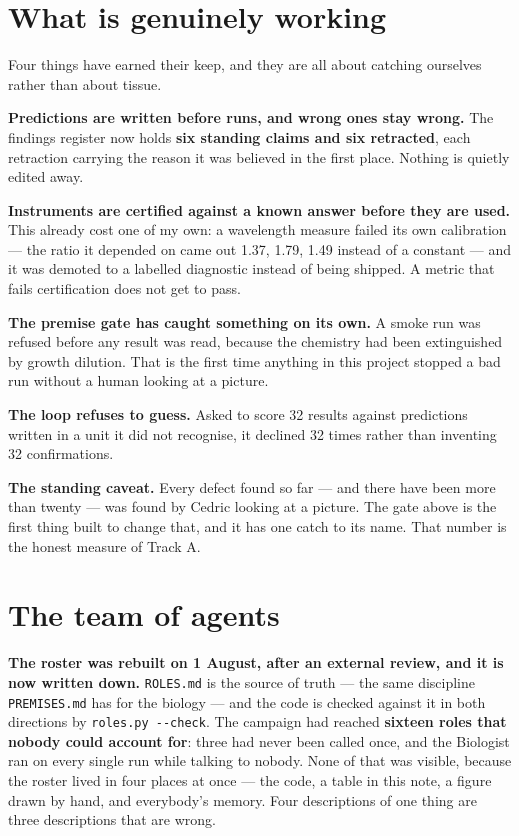 \documentclass[11pt,a4paper]{article}
\newcommand{\code}[1]{\texttt{#1}}
\begin{document}
\section{What is genuinely working}

Four things have earned their keep, and they are all about catching ourselves rather than about
tissue.

\textbf{Predictions are written before runs, and wrong ones stay wrong.} The findings register now
holds \textbf{six standing claims and six retracted}, each retraction carrying the reason it was
believed in the first place. Nothing is quietly edited away.

\textbf{Instruments are certified against a known answer before they are used.} This already cost
one of my own: a wavelength measure failed its own calibration --- the ratio it depended on came out
1.37, 1.79, 1.49 instead of a constant --- and it was demoted to a labelled diagnostic instead of
being shipped. A metric that fails certification does not get to pass.

\textbf{The premise gate has caught something on its own.} A smoke run was refused before any result
was read, because the chemistry had been extinguished by growth dilution. That is the first time
anything in this project stopped a bad run without a human looking at a picture.

\textbf{The loop refuses to guess.} Asked to score 32 results against predictions written in a unit
it did not recognise, it declined 32 times rather than inventing 32 confirmations.

\textbf{The standing caveat.} Every defect found so far --- and there have been more than twenty ---
was found by Cedric looking at a picture. The gate above is the first thing built to change that,
and it has one catch to its name. That number is the honest measure of Track A.

\section{The team of agents}\label{sec:agents}

\textbf{The roster was rebuilt on 1 August, after an external review, and it is now written down.}
\code{ROLES.md} is the source of truth --- the same discipline \code{PREMISES.md} has for the
biology --- and the code is checked against it in both directions by \code{roles.py -{}-check}.
The campaign had reached \textbf{sixteen roles that nobody could account for}: three had never been
called once, and the Biologist ran on every single run while talking to nobody. None of that was
visible, because the roster lived in four places at once --- the code, a table in this note, a
figure drawn by hand, and everybody's memory. Four descriptions of one thing are three descriptions
that are wrong.
\end{document}
